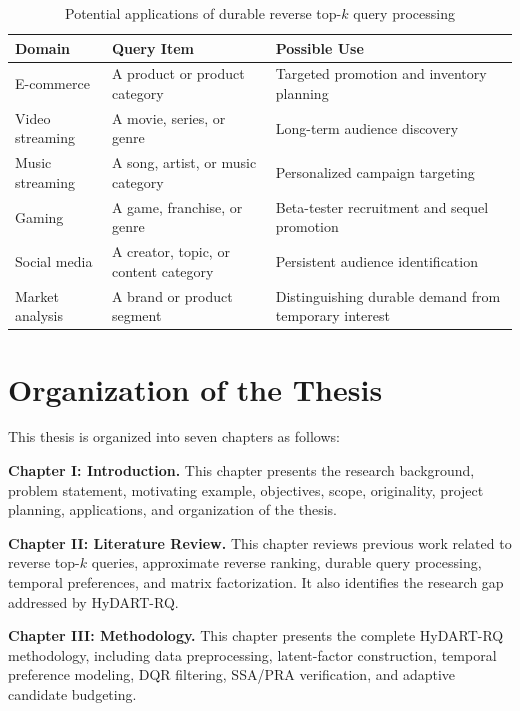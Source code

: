 \begin{table}[htbp]
\centering
\caption{Potential applications of durable reverse top-$k$ query processing}
\label{tab:application_summary}
\small
\renewcommand{\arraystretch}{1.25}
\setlength{\tabcolsep}{4pt}
\begin{tabularx}{\textwidth}{|p{3.2cm}|X|X|}
\hline
\textbf{Domain} &
\textbf{Query Item} &
\textbf{Possible Use} \\
\hline
E-commerce &
A product or product category &
Targeted promotion and inventory planning \\
\hline
Video streaming &
A movie, series, or genre &
Long-term audience discovery \\
\hline
Music streaming &
A song, artist, or music category &
Personalized campaign targeting \\
\hline
Gaming &
A game, franchise, or genre &
Beta-tester recruitment and sequel promotion \\
\hline
Social media &
A creator, topic, or content category &
Persistent audience identification \\
\hline
Market analysis &
A brand or product segment &
Distinguishing durable demand from temporary interest \\
\hline
\end{tabularx}
\end{table}


\section{Organization of the Thesis}
\label{sec:thesis_organization}

This thesis is organized into seven chapters as follows:

\noindent
\textbf{Chapter I: Introduction.}
This chapter presents the research background, problem statement, motivating example, objectives, scope, originality, project planning, applications, and organization of the thesis.

\noindent
\textbf{Chapter II: Literature Review.}
This chapter reviews previous work related to reverse top-$k$ queries, approximate reverse ranking, durable query processing, temporal preferences, and matrix factorization. It also identifies the research gap addressed by HyDART-RQ.

\noindent
\textbf{Chapter III: Methodology.}
This chapter presents the complete HyDART-RQ methodology, including data preprocessing, latent-factor construction, temporal preference modeling, DQR filtering, SSA/PRA verification, and adaptive candidate budgeting.

